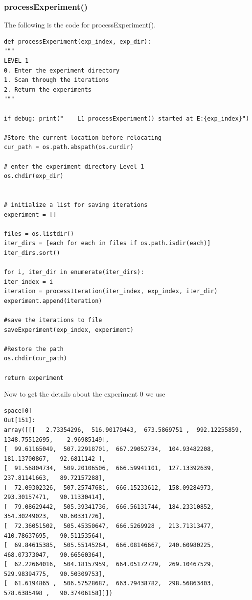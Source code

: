 \documentclass[12pt, twoside, a4paper]{article}
\begin{document}
\subsubsection{processExperiment()}
The following is the code for processExperiment(). 
\begin{verbatim}
def processExperiment(exp_index, exp_dir):
"""
LEVEL 1
0. Enter the experiment directory
1. Scan through the iterations
2. Return the experiments
"""

if debug: print("    L1 processExperiment() started at E:{exp_index}")

#Store the current location before relocating
cur_path = os.path.abspath(os.curdir)

# enter the experiment directory Level 1
os.chdir(exp_dir)


# initialize a list for saving iterations
experiment = []

files = os.listdir()
iter_dirs = [each for each in files if os.path.isdir(each)]
iter_dirs.sort()

for i, iter_dir in enumerate(iter_dirs):
iter_index = i
iteration = processIteration(iter_index, exp_index, iter_dir)
experiment.append(iteration)

#save the iterations to file    
saveExperiment(exp_index, experiment)

#Restore the path
os.chdir(cur_path)

return experiment
\end{verbatim}
%
Now to get the details about the  experiment 0 we use
\begin{verbatim}
space[0]
Out[151]: 
array([[[   2.73354296,  516.90179443,  673.5869751 ,  992.12255859,
1348.75512695,    2.96985149],
[  99.61165049,  507.22918701,  667.29052734,  104.93482208,
181.13700867,   92.6811142 ],
[  91.56804734,  509.20106506,  666.59941101,  127.13392639,
237.81141663,   89.72157288],
[  72.09302326,  507.25747681,  666.15233612,  158.09284973,
293.30157471,   90.11330414],
[  79.08629442,  505.39341736,  666.56131744,  184.23310852,
354.30249023,   90.60331726],
[  72.36051502,  505.45350647,  666.5269928 ,  213.71313477,
410.78637695,   90.51153564],
[  69.84615385,  505.55145264,  666.08146667,  240.60980225,
468.07373047,   90.66560364],
[  62.22664016,  504.18157959,  664.05172729,  269.10467529,
529.98394775,   90.50309753],
[  61.6194865 ,  506.57528687,  663.79438782,  298.56863403,
578.6385498 ,   90.37406158]]])
\end{verbatim}
%
\end{document}
